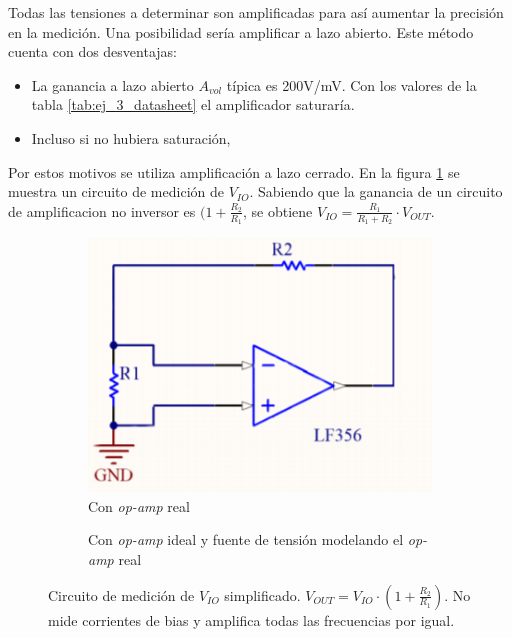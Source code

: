 \documentclass[../../main.tex]{subfiles}
\begin{document}
Todas las tensiones a determinar son amplificadas para as\'i aumentar la precisi\'on en la medici\'on. Una posibilidad ser\'ia amplificar a lazo abierto. Este m\'etodo cuenta con dos desventajas:
\begin{itemize}
	\item La ganancia a lazo abierto $A_{vol}$ t\'ipica es 200V/mV. Con los valores de la tabla \ref{tab:ej_3_datasheet} el amplificador saturar\'ia.
	\item Incluso si no hubiera saturaci\'on, 
\end{itemize}
Por estos motivos se utiliza amplificaci\'on a lazo cerrado. En la figura \ref{fig:ej_3_medicion_vio_simple} se muestra un circuito de medici\'on de $V_{IO}$. Sabiendo que la ganancia de un circuito de amplificacion no inversor es $(1+\frac{R_2}{R_1}$, se obtiene $V_{IO} = \frac{R_1}{R_1+R_2}\cdot V_{OUT}$. 


\begin{figure}[htb]	%
	\centering
	\begin{subfigure}[t]{0.43\textwidth}
		\centering
		\includegraphics[width=\textwidth]{imagenes/medicion_vio_configuracion_simplificada.png}
		\caption{Con \textit{op-amp} real}
	\end{subfigure}%
	\hfill%
	\begin{subfigure}[t]{0.43\textwidth}
		\centering
		\caption{Con \textit{op-amp} ideal y fuente de tensi\'on modelando el \textit{op-amp} real}
	\end{subfigure}	
	\caption[Circuito de medici\'on de $V_{IO}$ simplificado.]{Circuito de medici\'on de $V_{IO}$ simplificado.  $V_{OUT} = V_{IO} \cdot \left( 1+ \frac{R_2}{R_1} \right) $. No mide corrientes de bias y amplifica todas las frecuencias por igual.}
	\label{fig:ej_3_medicion_vio_simple}
\end{figure}
\end{document}
